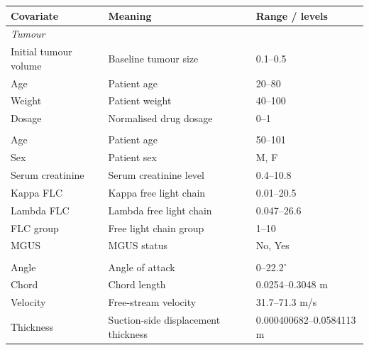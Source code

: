\begin{tabular}{lll}
\toprule
Covariate & Meaning & Range / levels \\
\midrule
\multicolumn{3}{l}{\textit{Tumour}} \\
Initial tumour volume & Baseline tumour size & 0.1--0.5 \\
Age & Patient age & 20--80 \\
Weight & Patient weight & 40--100 \\
Dosage & Normalised drug dosage & 0--1 \\
\addlinespace
\multicolumn{3}{l}{\textit{Flchain}} \\
Age & Patient age & 50--101 \\
Sex & Patient sex & M, F \\
Serum creatinine & Serum creatinine level & 0.4--10.8 \\
Kappa FLC & Kappa free light chain & 0.01--20.5 \\
Lambda FLC & Lambda free light chain & 0.047--26.6 \\
FLC group & Free light chain group & 1--10 \\
MGUS & MGUS status & No, Yes \\
\addlinespace
\multicolumn{3}{l}{\textit{Airfoil}} \\
Angle & Angle of attack & 0--22.2$^\circ$ \\
Chord & Chord length & 0.0254--0.3048 m \\
Velocity & Free-stream velocity & 31.7--71.3 m/s \\
Thickness & Suction-side displacement thickness & 0.000400682--0.0584113 m \\
\bottomrule
\end{tabular}
